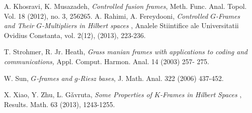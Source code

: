 \documentclass[11pt]{amsart}
\theoremstyle{definition}
\theoremstyle{remark}
\numberwithin{equation}{section}
\begin{document}
\begin{thebibliography}{99}
 A. Khosravi, K. Musazadeh, {\it Controlled fusion frames}, Meth. Func. Anal. Topol.
Vol. 18 (2012), no. 3, 256265.
	A. Rahimi, A. Fereydooni, {\it Controlled $G$-Frames and Their $G$-Multipliers in Hilbert spaces }, Analele Stiintifice ale Universitatii Ovidius Constanta, vol. 2(12), (2013), 223-236.

 T. Strohmer, R. Jr. Heath,  {\it Grass manian frames with applications to coding and communications,} Appl. Comput. Harmon. Anal. 14 (2003)  257- 275.

 W. Sun,  {\it $G$-frames and $g$-Riesz bases}, J. Math. Anal. 322 (2006)  437-452.

 X. Xiao, Y. Zhu, L. G\v{a}vruta, {\it Some Properties of $K$-Frames in Hilbert Spaces }, Results. Math. 63 (2013), 1243-1255.

\end{thebibliography}
\end{document}
